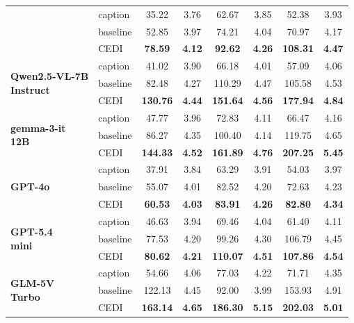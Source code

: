 \begin{table}[t]
\begin{tabular}{@{}l|l|cc|cc|cc@{}}
  & caption  & 35.22 & 3.76 & 62.67 & 3.85 & 52.38 & 3.93 \\
  & baseline & 52.85 & 3.97 & 74.21 & 4.04 & 70.97 & 4.17 \\
\rowcolor[HTML]{E6F2FF}
  \multicolumn{1}{l}{\cellcolor{white}} & CEDI & \textbf{78.59} & \textbf{4.12} & \textbf{92.62} & \textbf{4.26} & \textbf{108.31} & \textbf{4.47} \\
\midrule
\multirow{3}{*}{\parbox{2.5cm}{\centering\textbf{Qwen2.5-VL-7B}\\ \textbf{Instruct}}}
  & caption  & 41.02 & 3.90 & 66.18 & 4.01 & 57.09 & 4.06 \\
  & baseline & 82.48 & 4.27 & 110.29 & 4.47 & 105.58 & 4.53 \\
\rowcolor[HTML]{E6F2FF}
  \multicolumn{1}{l}{\cellcolor{white}} & CEDI & \textbf{130.76} & \textbf{4.44} & \textbf{151.64} & \textbf{4.56} & \textbf{177.94} & \textbf{4.84} \\
\midrule
\multirow{3}{*}{\parbox{2.5cm}{\centering\textbf{gemma-3-it}\\ \textbf{12B}}}
  & caption  & 47.77 & 3.96 & 72.83 & 4.11 & 66.47 & 4.16 \\
  & baseline & 86.27 & 4.35 & 100.40 & 4.14 & 119.75 & 4.65 \\
\rowcolor[HTML]{E6F2FF}
  \multicolumn{1}{l}{\cellcolor{white}} & CEDI & \textbf{144.33} & \textbf{4.52} & \textbf{161.89} & \textbf{4.76} & \textbf{207.25} & \textbf{5.45} \\
\midrule
\multirow{3}{*}{\parbox{2.5cm}{\centering\textbf{GPT-4o}\\ }}
  & caption  & 37.91 & 3.84 & 63.29 & 3.91 & 54.03 & 3.97 \\
  & baseline & 55.07 & 4.01 & 82.52 & 4.20 & 72.63 & 4.23 \\
\rowcolor[HTML]{E6F2FF}
  \multicolumn{1}{l}{\cellcolor{white}} & CEDI & \textbf{60.53} & \textbf{4.03} & \textbf{83.91} & \textbf{4.26} & \textbf{82.80} & \textbf{4.34} \\
\midrule
\multirow{3}{*}{\parbox{2.5cm}{\centering\textbf{GPT-5.4}\\ \textbf{mini}}}
  & caption  & 46.63 & 3.94 & 69.46 & 4.04 & 61.40 & 4.11 \\
  & baseline & 77.53 & 4.20 & 99.26 & 4.30 & 106.79 & 4.45 \\
\rowcolor[HTML]{E6F2FF}
  \multicolumn{1}{l}{\cellcolor{white}} & CEDI & \textbf{80.62} & \textbf{4.21} & \textbf{110.07} & \textbf{4.51} & \textbf{107.86} & \textbf{4.54} \\
\midrule
\multirow{3}{*}{\parbox{2.5cm}{\centering\textbf{GLM-5V}\\ \textbf{Turbo}}}
  & caption  & 54.66 & 4.06 & 77.03 & 4.22 & 71.71 & 4.35 \\
  & baseline & 122.13 & 4.45 & 92.00 & 3.99 & 153.93 & 4.91 \\
\rowcolor[HTML]{E6F2FF}
  \multicolumn{1}{l}{\cellcolor{white}} & CEDI & \textbf{163.14} & \textbf{4.65} & \textbf{186.30} & \textbf{5.15} & \textbf{202.03} & \textbf{5.01} \\
\bottomrule
\end{tabular}
\end{table}
